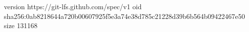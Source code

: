 version https://git-lfs.github.com/spec/v1
oid sha256:0ab8218644a720b00607925f5e3a74e38d785c21228d39b6b564b09422467e50
size 131168
